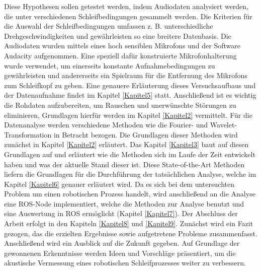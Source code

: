 Diese Hypothesen sollen getestet werden, indem Audiodaten analysiert werden, die unter verschiedenen Schleifbedingungen gesammelt werden. Die Kriterien für die Auswahl der Schleifbedingungen umfassen z. B. unterschiedliche Drehgeschwindigkeiten und gewährleisten so eine breitere Datenbasis. Die Audiodaten wurden mittels eines hoch sensiblen Mikrofons und der Software Audacity aufgenommen. Eine speziell dafür konstruierte Mikrofonhalterung wurde verwendet, um einerseits konstante Aufnahmebedingungen zu gewährleisten und andererseits ein Spielraum für die Entfernung des Mikrofons zum Schleifkopf zu geben. Eine genauere Erläuterung dieses Versuchsaufbaus und der Datenaufnahme findet im Kapitel \ref{Kapitel5} statt. Anschließend ist es wichtig die Rohdaten aufzubereiten, um Rauschen und unerwünschte Störungen zu eliminieren, Grundlagen hierfür werden im Kapitel \ref{Kapitel2} vermittelt. Für die Datenanalyse werden verschiedene Methoden wie die Fourier- und Wavelet-Transformation in Betracht bezogen. Die Grundlagen dieser Methoden wird zunächst in Kapitel \ref{Kapitel2} erläutert. Das Kapitel \ref{Kapitel3} baut auf diesen Grundlagen auf und erläutert wie die Methoden sich im Laufe der Zeit entwickelt haben und was der aktuelle Stand dieser ist. Diese State-of-the-Art Methoden liefern die Grundlagen für die Durchführung der tatsächlichen Analyse, welche im Kapitel \ref{Kapitel6} genauer erläutert wird. Da es sich bei dem untersuchten Problem um einen robotischen Prozess handelt, wird anschließend an die Analyse eine ROS-Node implementiert, welche die Methoden zur Analyse benutzt und eine Auswertung in ROS ermöglicht (Kapitel \ref{Kapitel7}). Der Abschluss der Arbeit erfolgt in den Kapiteln \ref{Kapitel8} und \ref{Kapitel9}. Zunächst wird ein Fazit gezogen, das die erzielten Ergebnisse sowie aufgetretene Probleme zusammenfasst. Anschließend wird ein Ausblick auf die Zukunft gegeben. Auf Grundlage der gewonnenen Erkenntnisse werden Ideen und Vorschläge präsentiert, um die akustische Vermessung eines robotischen Schleifprozesses weiter zu verbessern. 


\endinput
